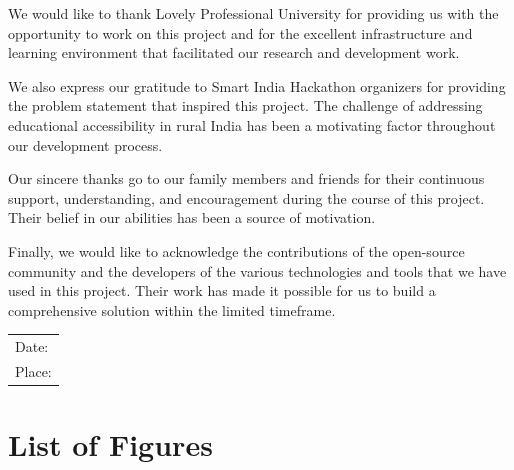 \documentclass[12pt,a4paper]{report}
\begin{document}
We would like to thank Lovely Professional University for providing us with the opportunity to work on this project and for the excellent infrastructure and learning environment that facilitated our research and development work.

We also express our gratitude to Smart India Hackathon organizers for providing the problem statement that inspired this project. The challenge of addressing educational accessibility in rural India has been a motivating factor throughout our development process.

Our sincere thanks go to our family members and friends for their continuous support, understanding, and encouragement during the course of this project. Their belief in our abilities has been a source of motivation.

Finally, we would like to acknowledge the contributions of the open-source community and the developers of the various technologies and tools that we have used in this project. Their work has made it possible for us to build a comprehensive solution within the limited timeframe.

\vspace{2cm}

\begin{flushright}
\begin{tabular}{l}
Date: \hrulefill \\
Place: \hrulefill
\end{tabular}
\end{flushright}

\newpage
\chapter*{List of Figures}
\end{document}
